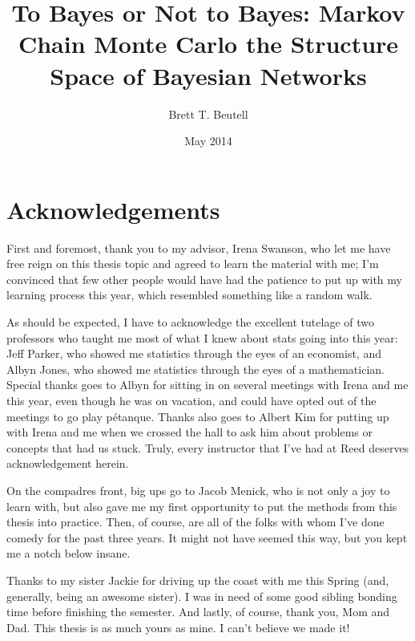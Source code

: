\documentclass[12pt,twoside]{reedthesis}
\title{To Bayes or Not to Bayes: Markov Chain Monte Carlo  the Structure Space of Bayesian Networks}
\author{Brett T. Beutell}
\date{May 2014}
\begin{document}
  \maketitle
  \frontmatter %
  \pagestyle{empty} %

    \chapter*{Acknowledgements}
	First and foremost, thank you to my advisor, Irena Swanson, who let me have free reign on this thesis topic and agreed to learn the material with me; 
	I'm convinced that few other people would have had the patience to put up with my learning process this year, which resembled something like a random walk. 
	
	As should be expected, I have to acknowledge the excellent tutelage of two professors who taught me most of what I knew about stats going into this year: Jeff Parker, who showed me statistics through the eyes of an economist, and Albyn Jones, who showed me statistics through the eyes of a mathematician. 
	Special thanks goes to Albyn for sitting in on several meetings with Irena and me this year, even though he was on vacation, and could have opted out of the meetings to go play p\'{e}tanque. 
	Thanks also goes to Albert Kim for putting up with Irena and me when we crossed the hall to ask him about problems or concepts that had us stuck. 
	Truly, every instructor that I've had at Reed deserves acknowledgement herein. 

	On the compadres front, big ups go to Jacob Menick, who is not only a joy to learn with, but also gave me my first opportunity to put the methods from this thesis into practice. Then, of course, are all of the folks with whom I've done comedy for the past three years. It might not have seemed this way, but you kept me a notch below insane. 
	
	Thanks to my sister Jackie for driving up the coast with me this Spring (and, generally, being an awesome sister). I was in need of some good sibling bonding time before finishing the semester. And lastly, of course, thank you, Mom and Dad. This thesis is as much yours as mine. I can't believe we made it!
	
	
	

\end{document}
